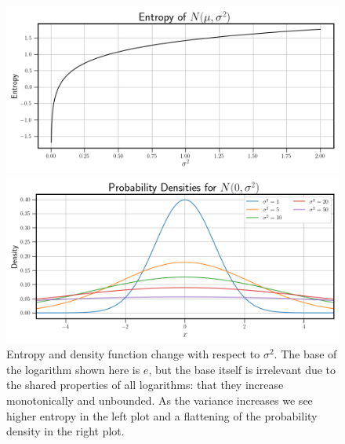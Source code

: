 \begin{figure}[ht]
    \centering
    \begin{minipage}{.5\textwidth}
        \includegraphics[width=\textwidth]{Figures/entropy_example.png}
    \end{minipage}%
    \begin{minipage}{.5\textwidth}
        \includegraphics[width=\textwidth]{Figures/densities_example.png}
    \end{minipage}

    \caption{Entropy and density function change with respect to $\sigma^2$. The base 
    of the logarithm shown here is $e$, but the base itself is irrelevant due to the shared
    properties of all logarithms: that they increase monotonically and unbounded. As the 
    variance increases we see higher entropy in the left plot and a flattening of the 
    probability density in the right plot.}
    \label{fig:entropy example}
\end{figure}

